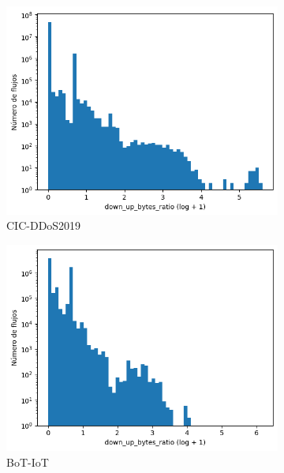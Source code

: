 \begin{figure}[H]
    \centering
    \begin{subfigure}[b]{0.32\textwidth}
        \centering
        \includegraphics[width=\textwidth]{media/packet_pincer_cicddos/down_up_bytes_ratio_log_x_log_y.png}
        \caption{CIC-DDoS2019}
    \end{subfigure}
    \hfill
    \begin{subfigure}[b]{0.32\textwidth}
        \centering
        \includegraphics[width=\linewidth]{media/packet_pincer_botiot/down_up_bytes_ratio_log_x_log_y.png}
        \caption{BoT-IoT}
    \end{subfigure}
    \hfill
    \begin{subfigure}[b]{0.32\textwidth}

\end{subfigure}
\end{figure}
